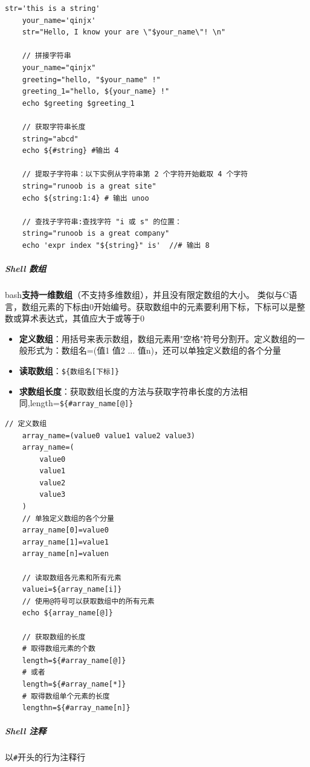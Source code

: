 \documentclass[UTF8,a4paper,12pt]{ctexbook}
\begin{document}
					\begin{lstlisting}[xleftmargin=.06\textwidth]
	str='this is a string'
	your_name='qinjx'
	str="Hello, I know your are \"$your_name\"! \n"
	
	// 拼接字符串
	your_name="qinjx"
	greeting="hello, "$your_name" !"
	greeting_1="hello, ${your_name} !"
	echo $greeting $greeting_1
	
	// 获取字符串长度 
	string="abcd"
	echo ${#string} #输出 4
	
	// 提取子字符串：以下实例从字符串第 2 个字符开始截取 4 个字符
	string="runoob is a great site"
	echo ${string:1:4} # 输出 unoo
	
	// 查找子字符串:查找字符 "i 或 s" 的位置：
	string="runoob is a great company"
	echo 'expr index "${string}" is'  //# 输出 8
					\end{lstlisting}
					
				\subparagraph{Shell 数组}
					bash\textbf{支持一维数组}（不支持多维数组），并且没有限定数组的大小。
					类似与C语言，数组元素的下标由0开始编号。获取数组中的元素要利用下标，下标可以是整数或算术表达式，其值应大于或等于0
					\begin{itemize}
						\item  \textbf{定义数组}：用括号来表示数组，数组元素用"空格"符号分割开。定义数组的一般形式为：数组名=(值1 值2 ... 值n)，还可以单独定义数组的各个分量
						 
						\item  \textbf{读取数组}：\verb|${数组名[下标]}|
						\item  \textbf{求数组长度}：获取数组长度的方法与获取字符串长度的方法相同,length=\verb|${#array_name[@]}|
					\end{itemize}
				
					\begin{lstlisting}[xleftmargin=.06\textwidth]
	// 定义数组
	array_name=(value0 value1 value2 value3)
	array_name=(
		value0
		value1
		value2
		value3
	)
	// 单独定义数组的各个分量
	array_name[0]=value0
	array_name[1]=value1
	array_name[n]=valuen
	
	// 读取数组各元素和所有元素
	valuei=${array_name[i]}
	// 使用@符号可以获取数组中的所有元素
	echo ${array_name[@]}
	
	// 获取数组的长度 
	# 取得数组元素的个数
	length=${#array_name[@]}
	# 或者
	length=${#array_name[*]}
	# 取得数组单个元素的长度
	lengthn=${#array_name[n]}
					\end{lstlisting}
				\subparagraph{Shell 注释}
					以\verb|#|开头的行为注释行
				
				
\end{document}
